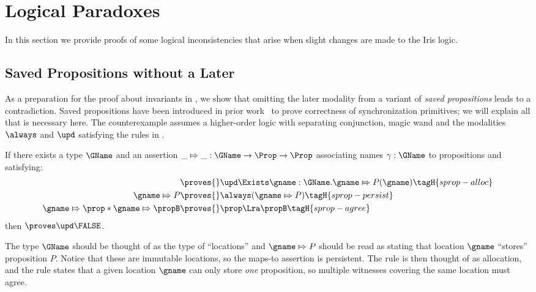 \section{Logical Paradoxes}
\newcommand{\starttoken}{\textsc{s}}
\newcommand{\finishtoken}{\textsc{f}}

In this section we provide proofs of some logical inconsistencies that arise when slight changes are made to the Iris logic.

\subsection{Saved Propositions without a Later}
\label{sec:saved-prop-no-later}

As a preparation for the proof about invariants in , we show that omitting the later modality from a variant of \emph{saved propositions} leads to a contradiction.
Saved propositions have been introduced in prior work~\cite{dodds:higher-order-sync,iris2} to prove correctness of synchronization primitives; we will explain all that is necessary here.
The counterexample assumes a higher-order logic with separating conjunction, magic wand and the modalities $\always$ and $\upd$ satisfying the rules in .

\begin{thm}
\label{thm:counterexample-1}
If there exists a type $\GName$ and an assertion $\_ \Mapsto \_ : \GName \to \Prop \to \Prop$ associating names $\gamma : \GName$ to propositions and satisfying:
\begin{align}
    \proves{}& \upd \Exists \gname : \GName. \gname \Mapsto P(\gname)
               \tagH{sprop-alloc} \\
    \gname \Mapsto P \proves{}& \always (\gname \Mapsto P)
               \tagH{sprop-persist} \\
    \gname \Mapsto \prop * \gname \Mapsto \propB \proves{}
             &
               \prop \Lra \propB
               \tagH{sprop-agree}
\end{align}
then $\proves\upd \FALSE$.
\end{thm}

The type $\GName$ should be thought of as the type of ``locations'' and $\gname \Mapsto P$ should be read as stating that location $\gname$ ``stores'' proposition $P$.
Notice that these are immutable locations, so the maps-to assertion is persistent.
The rule  is then thought of as allocation, and the rule  states that a given location $\gname$ can only store \emph{one} proposition, so multiple witnesses covering the same location must agree.

